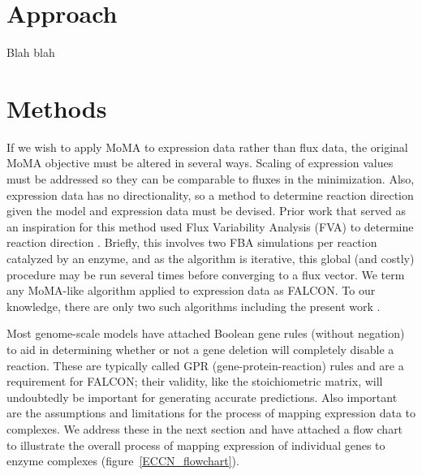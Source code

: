\section{Approach}

Blah blah

\section{Methods}




If we wish to apply MoMA to expression data rather than flux data, the
original MoMA objective must be altered in several ways. Scaling of
expression values must be addressed so they can be comparable to
fluxes in the minimization. Also, expression data has no
directionality, so a method to determine reaction direction given the
model and expression data must be devised. Prior work that served as
an inspiration for this method used Flux Variability Analysis (FVA) to
determine reaction direction \cite{Lee2012}. Briefly, this involves
two FBA simulations per reaction catalyzed by an enzyme, and as the
algorithm is iterative, this global (and costly) procedure may be run
several times before converging to a flux vector. We term any
MoMA-like algorithm applied to expression data as FALCON. To our
knowledge, there are only two such algorithms including the present
work \cite{Lee2012}.

Most genome-scale models have attached Boolean gene rules (without
negation) to aid in determining whether or not a gene deletion will
completely disable a reaction. These are typically called GPR
(gene-protein-reaction) rules and are a requirement for FALCON; their
validity, like the stoichiometric matrix, will undoubtedly be
important for generating accurate predictions. Also important are the
assumptions and limitations for the process of mapping expression data
to complexes. We address these in the next section and have attached a
flow chart to illustrate the overall process of mapping expression of
individual genes to enzyme complexes (figure~\ref{ECCN_flowchart}).


